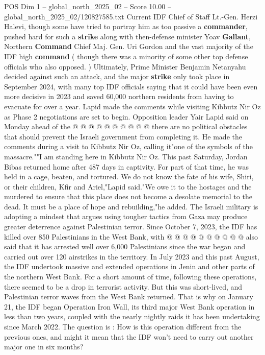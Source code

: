 \begin{textsample}{POS Dim 1 – global\_north\_2025\_02 – Score 10.00 – global\_north\_2025\_02/120827585.txt}
Current IDF Chief of Staff Lt.-Gen.
Herzi Halevi, though some have tried to portray him as too passive a \textbf{commander}, pushed hard for such a \textbf{strike} along with then-defense minister Yoav \textbf{Gallant}, Northern \textbf{Command} Chief Maj.
Gen.
Uri Gordon and the vast majority of the IDF high \textbf{command} ( though there was a minority of some other top defense officials who also opposed. ) Ultimately, Prime Minister Benjamin Netanyahu decided against such an attack, and the major \textbf{strike} only took place in September 2024, with many top IDF officials saying that it could have been even more decisive in 2023 and saved 60,000 northern residents from having to evacuate for over a year.
Lapid made the comments while visiting Kibbutz Nir Oz as Phase 2 negotiations are set to begin.
Opposition leader Yair Lapid said on Monday ahead of the @ @ @ @ @ @ @ @ @ @ there are no political obstacles that should prevent the Israeli government from completing it.
He made the comments during a visit to Kibbutz Nir Oz, calling it"one of the symbols of the massacre.""I am standing here in Kibbutz Nir Oz.
This past Saturday, Jordan Bibas returned home after 487 days in captivity.
For part of that time, he was held in a cage, beaten, and tortured.
We do not know the fate of his wife, Shiri, or their children, Kfir and Ariel,"Lapid said."We owe it to the hostages and the murdered to ensure that this place does not become a desolate memorial to the dead.
It must be a place of hope and rebuilding,"he added.
The Israeli military is adopting a mindset that argues using tougher tactics from Gaza may produce greater deterrence against Palestinian terror.
Since October 7, 2023, the IDF has killed over 850 Palestinians in the West Bank, with @ @ @ @ @ @ @ @ @ @ also said that it has arrested well over 6,000 Palestinians since the war began and carried out over 120 airstrikes in the territory.
In July 2023 and this past August, the IDF undertook massive and extended operations in Jenin and other parts of the northern West Bank.
For a short amount of time, following these operations, there seemed to be a drop in terrorist activity.
But this was short-lived, and Palestinian terror waves from the West Bank returned.
That is why on January 21, the IDF began Operation Iron Wall, its third major West Bank operation in less than two years, coupled with the nearly nightly raids it has been undertaking since March 2022.
The question is : How is this operation different from the previous ones, and might it mean that the IDF won't need to carry out another major one in six months?

\end{textsample}
